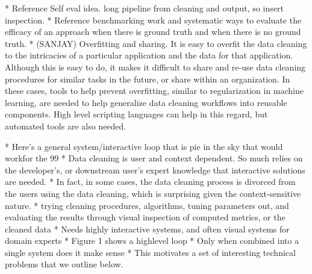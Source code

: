     * Reference Self eval idea.  long pipeline from cleaning and output, so insert inspection.  
    * Reference benchmarking work and systematic ways to evaluate the efficacy of an approach when there is ground truth and when there is no ground truth.
* (SANJAY) Overfitting and sharing.   It is easy to overfit the data cleaning to the intricacies of a particular application and the data for that application.  Although this is easy to do, it makes it difficult to share and re-use data cleaning procedures for similar tasks in the future, or share within an organization.  In these cases, tools to help prevent overfitting, similar to regularization in machine learning, are needed to help generalize data cleaning workflows into reusable components.  High level scripting languages can help in this regard, but automated tools are also needed.




* Here’s a general system/interactive loop that is pie in the sky that would workfor the 99%
    * Data cleaning is user and context dependent.  So much relies on the developer’s, or downstream user's expert knowledge that interactive solutions are needed.    
    * In fact, in some cases, the data cleaning process is divorced from the users using the data cleaning, which is surprising given the context-sensitive nature.
    * trying cleaning procedures, algorithms, tuning parameters out, and evaluating the results through visual inspection of computed metrics, or the cleaned data
    * Needs highly interactive systems, and often visual systems for domain experts
    * Figure 1 shows a highlevel loop
    * Only when combined into a single system does it make sense
    * This motivates a set of interesting technical problems that we outline below.

\fi
